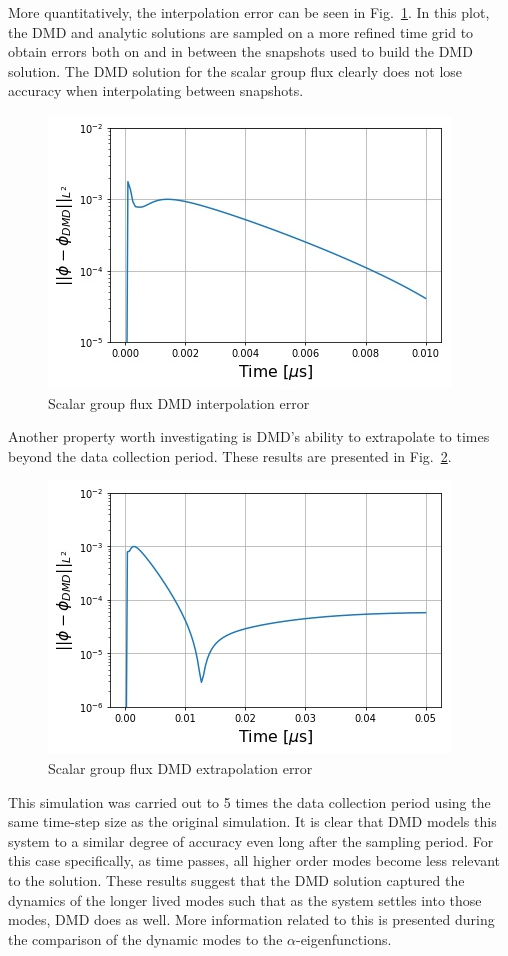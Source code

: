 \documentclass{style/nseJournal}
\newcommand{\LFI}[1]{\label{fi:#1}}
\newcommand{\FI}[1]{Fig.~\ref{fi:#1}}
\newcommand{\bfg}{\begin{figure}}
\newcommand{\efg}{\end{figure}}
\begin{document}
More quantitatively, the interpolation error can be seen in \FI{interp-flux}.  
In this plot, the DMD and analytic solutions are sampled on a more refined time grid to obtain errors both on and in between the snapshots used to build the DMD solution.  
The DMD solution for the scalar group flux clearly does not lose accuracy when interpolating between snapshots.  
\bfg[!htb] \centering
	\includegraphics[scale=0.5]{figures/NSE19-11Fig05.jpg}
	\caption{Scalar group flux DMD interpolation error}
	\LFI{interp-flux}
\efg
Another property worth investigating is DMD's ability to extrapolate to times beyond the data collection period.  
These results are presented in \FI{extrap-flux}.  
\bfg[!htb] \centering
	\includegraphics[scale=0.5]{figures/NSE19-11Fig06.jpg}
	\caption{Scalar group flux DMD extrapolation error}
	\LFI{extrap-flux}
\efg
This simulation was carried out to 5 times the data collection period using the same time-step size as the original simulation.  
It is clear that DMD models this system to a similar degree of accuracy even long after the sampling period.  
For this case specifically, as time passes, all higher order modes become less relevant to the solution.  
These results suggest that the DMD solution captured the dynamics of the longer lived modes such that as the system settles into those modes, DMD does as well.  
More information related to this is presented during the comparison of the dynamic modes to the $\alpha$-eigenfunctions.  
\end{document}
